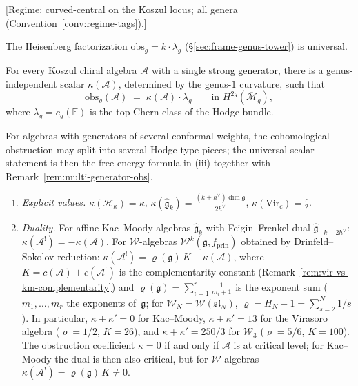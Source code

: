 \begin{theorem}\label{thm:genus-universality}
\textup{[Regime: curved-central on the Koszul locus; all genera
\textup{(}Convention~\textup{\ref{conv:regime-tags})}.]}

The Heisenberg factorization $\mathrm{obs}_g = k \cdot \lambda_g$ (\S\ref{sec:frame-genus-tower}) is universal.

For every Koszul chiral algebra $\mathcal{A}$ with a single strong generator, there is a genus-independent scalar $\kappa(\mathcal{A})$, determined by the genus-$1$ curvature, such that
\begin{equation}\label{eq:genus-universality}
\mathrm{obs}_g(\mathcal{A}) \;=\; \kappa(\mathcal{A}) \cdot \lambda_g
\qquad \text{in } H^{2g}(\overline{\mathcal{M}}_g),
\end{equation}
where $\lambda_g = c_g(\mathbb{E})$ is the top Chern class of the Hodge bundle.

For algebras with generators of several conformal weights, the
cohomological obstruction may split into several Hodge-type pieces; the
universal scalar statement is then the free-energy formula in
\textup{(iii)} together with
Remark~\textup{\ref{rem:multi-generator-obs}}.

\begin{enumerate}
\item[\textup{(i)}] \emph{Explicit values.}
$\kappa(\mathcal{H}_\kappa) = \kappa$,\;
$\kappa(\widehat{\mathfrak{g}}_k) = \frac{(k+h^\vee)\dim\mathfrak{g}}{2h^\vee}$,\;
$\kappa(\mathrm{Vir}_c) = \frac{c}{2}$.
\item[\textup{(ii)}] \emph{Duality.}
For affine Kac--Moody algebras $\widehat{\mathfrak{g}}_k$ with Feigin--Frenkel dual
$\widehat{\mathfrak{g}}_{-k-2h^\vee}$: $\kappa(\mathcal{A}^!) = -\kappa(\mathcal{A})$.
For $\mathcal{W}$-algebras $\mathcal{W}^k(\mathfrak{g}, f_{\mathrm{prin}})$ obtained by Drinfeld--Sokolov
reduction: $\kappa(\mathcal{A}^!) = \varrho(\mathfrak{g})\, K - \kappa(\mathcal{A})$, where
$K = c(\mathcal{A}) + c(\mathcal{A}^!)$ is the complementarity constant
(Remark~\ref{rem:vir-vs-km-complementarity}) and
$\varrho(\mathfrak{g}) = \sum_{i=1}^r \frac{1}{m_i + 1}$ is the exponent sum
($m_1, \ldots, m_r$ the exponents of~$\mathfrak{g}$; for $\mathcal{W}_N = \mathcal{W}(\mathfrak{sl}_N)$,
$\varrho = H_N - 1 = \sum_{s=2}^{N} 1/s$).
In particular, $\kappa + \kappa' = 0$ for Kac--Moody,
$\kappa + \kappa' = 13$ for the Virasoro algebra ($\varrho = 1/2$, $K = 26$),
and $\kappa + \kappa' = 250/3$ for $\mathcal{W}_3$ ($\varrho = 5/6$, $K = 100$).
The obstruction coefficient $\kappa = 0$ if and only if $\mathcal{A}$ is at critical level;
for Kac--Moody the dual is then also critical, but for $\mathcal{W}$-algebras
$\kappa(\mathcal{A}^!) = \varrho(\mathfrak{g})\, K \neq 0$.


\end{enumerate}
\end{theorem}
